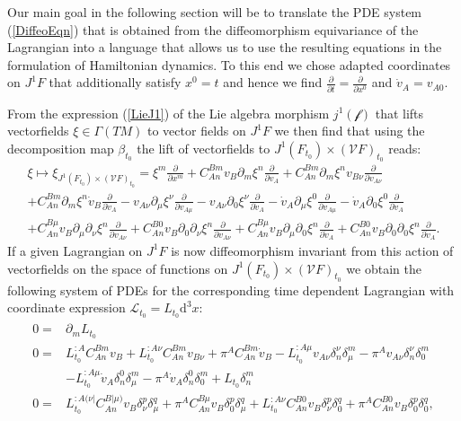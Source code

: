 \documentclass[a4paper,12pt, DIV=14, BCOR=5mm, twoside, headsepline]{scrbook}
\begin{document}
Our main goal in the following section will be to translate the PDE system (\ref{DiffeoEqn}) that is obtained from the diffeomorphism equivariance of the Lagrangian into a language that allows us to use the resulting equations in the formulation of Hamiltonian dynamics. To this end we chose adapted coordinates on $J^1F$ that additionally satisfy $x^0 = t$ and hence we find $\frac{\partial}{\partial t} = \frac{\partial}{\partial x^0}$ and $\dot{v}_A = v_{A0}$. 

From the expression (\ref{LieJ1}) of the Lie algebra morphism $j^1(\mathcal{f})$ that lifts vectorfields $\xi \in \Gamma(TM)$ to vector fields on $J^1F$ we then find that using the decomposition map $\beta_{t_0}$ the lift of vectorfields to $J^1(F_{t_0}) \times (\mathcal{V}F)_{t_0}$ reads:
\begin{multline}\label{LieJ1Dec}
    \xi \longmapsto \xi_{J^1(F_{t_0}) \times (\mathcal{V}F)_{t_0}} = \xi^m \frac{\partial}{\partial x^m} + C_{An}^{Bm} v_B \partial_{m} \xi ^n \frac{\partial}{\partial v_A}
    + C_{An}^{Bm} \partial_{m} \xi^n v_{B\nu} \frac{\partial}{\partial v_{A\nu}}\\
    + C_{An}^{Bm} \partial_{m} \xi^n \dot{v}_{B} \frac{\partial}{\partial \dot{v}_A} - v_{A\nu} \partial_{\mu} \xi^{\nu} \frac{\partial}{\partial v_{A\mu}} 
     - v_{A\nu} \partial_{0} \xi^{\nu} \frac{\partial}{\partial \dot{v}_{A}} 
    - \dot{v}_{A} \partial_{\mu} \xi^{0} \frac{\partial}{\partial v_{A\mu}}
     - \dot{v}_{A} \partial_{0} \xi^{0} \frac{\partial}{\partial \dot{v}_{A}}\\
    + C_{An}^{B\mu} v_B \partial_{\mu} \partial_{\nu} \xi^n \frac{\partial}{\partial v_{A\nu}}
    + C_{An}^{B0} v_B \partial_{0} \partial_{\nu} \xi^n \frac{\partial}{\partial v_{A\nu}}
    + C_{An}^{B\mu} v_B \partial_{\mu} \partial_{0} \xi^n \frac{\partial}{\partial \dot{v}_{A}}
    + C_{An}^{B0} v_B \partial_{0} \partial_{0} \xi^n \frac{\partial}{\partial \dot{v}_{A}}.
\end{multline}
If a given Lagrangian on $J^1F$ is now diffeomorphism invariant from this action of vectorfields on the space of functions on $J^1(F_{t_0}) \times (\mathcal{V}F)_{t_0}$ we obtain the following system of PDEs for the corresponding time dependent Lagrangian with coordinate expression $\mathcal{L}_{t_0} = L_{t_0}\mathrm{d}^3x$:
\begin{align}\label{diffeoHam}
    \begin{aligned}
    0 = &\partial_m L_{t_0} \\
    0 = &L_{t_0}^{:A} C_{An}^{Bm} v_B + L_{t_0}^{:A\nu} C_{An}^{B m} v_{B\nu} + \pi^A C_{An}^{B m}\dot{v}_B - L_{t_0}^{:A \mu} v_{A\nu} \delta^{\nu}_n \delta^m_{\mu}
    - \pi^A v_{A\nu} \delta^{\nu}_n \delta^m_{0} \\
    &- L_{t_0}^{:A \mu} \dot{v}_A \delta^0_n \delta^m_{\mu}
    - \pi^A \dot{v}_A \delta^0_n \delta^m_0 + L_{t_0} \delta_n^m \\
    0 = &L_{t_0}^{:A (\nu \vert } C_{An}^{B \vert \mu)} v_B \delta_{\nu}^{p} \delta_{\mu}^{q}
    +\pi^A C_{An}^{B  \mu} v_B \delta_{0}^{p} \delta_{\mu}^{q}
    +L_{t_0}^{:A \nu } C_{An}^{B 0} v_B \delta_{\nu}^{p} \delta_{0}^{q}
    +\pi^A C_{An}^{B  0} v_B \delta_{0}^{p} \delta_{0}^{q},
    \end{aligned}
\end{align}
\end{document}
